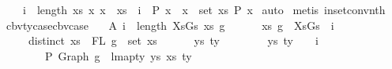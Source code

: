 \begin{isabellebody}
\ \ \ \ {\isachardoublequoteopen}{\isacharparenleft}{\kern0pt}{\isasymforall}i\ {\isacharless}{\kern0pt}\ length\ xs{\isachardot}{\kern0pt}\ {\isasymforall}x{\isachardot}{\kern0pt}\ {\isacharparenleft}{\kern0pt}x\ {\isacharequal}{\kern0pt}\ xs\ {\isacharbang}{\kern0pt}\ i\ {\isacharminus}{\kern0pt}{\isacharminus}{\kern0pt}{\isachargreater}{\kern0pt}\ P\ x{\isacharparenright}{\kern0pt}{\isacharparenright}{\kern0pt}\ {\isacharequal}{\kern0pt}\ {\isacharparenleft}{\kern0pt}{\isasymforall}x\ {\isasymin}\ set\ xs{\isachardot}{\kern0pt}\ {\isacharparenleft}{\kern0pt}P\ x{\isacharparenright}{\kern0pt}{\isacharparenright}{\kern0pt}{\isachardoublequoteclose}\isanewline
%
\isadelimproof
%
\endisadelimproof
%
\isatagproof
{}\isamarkupfalse%
\ auto\isanewline
{}\isamarkupfalse%
\ {\isacharparenleft}{\kern0pt}metis\ in{\isacharunderscore}{\kern0pt}set{\isacharunderscore}{\kern0pt}conv{\isacharunderscore}{\kern0pt}nth{\isacharparenright}{\kern0pt}%
\endisatagproof
{\isafoldproof}%
%
\isadelimproof
\isanewline
%
\endisadelimproof
\isanewline
\isanewline
{}\isamarkupfalse%
\ cbv{\isacharunderscore}{\kern0pt}ty{\isacharunderscore}{\kern0pt}case{\isacharunderscore}{\kern0pt}cbv{\isacharunderscore}{\kern0pt}case{\isacharcolon}{\kern0pt}\isanewline
\ \ \ A{}{\isacharcolon}{\kern0pt}\ {\isachardoublequoteopen}{\isasymforall}i\ {\isacharless}{\kern0pt}\ length\ XsGs{\isachardot}{\kern0pt}\ {\isasymforall}xs\ g{\isachardot}{\kern0pt}\ {\isacharparenleft}{\kern0pt}\isanewline
\ \ \ \ \ {\isacharparenleft}{\kern0pt}xs{\isacharcomma}{\kern0pt}\ g{\isacharparenright}{\kern0pt}\ {\isacharequal}{\kern0pt}\ XsGs\ {\isacharbang}{\kern0pt}\ i\ {\isacharminus}{\kern0pt}{\isacharminus}{\kern0pt}{\isachargreater}{\kern0pt}\isanewline
\ \ \ \ \ distinct\ xs\ {\isasymand}\ FL\ g\ {\isacharequal}{\kern0pt}\ set\ xs\ {\isasymand}\isanewline
\ \ \ \ \ {\isacharparenleft}{\kern0pt}{\isasymforall}ys\ ty{\isachardot}{\kern0pt}\ {\isacharparenleft}{\kern0pt}\isanewline
\ \ \ \ \ \ \ {\isacharparenleft}{\kern0pt}ys{\isacharcomma}{\kern0pt}\ ty{\isacharparenright}{\kern0pt}\ {\isacharequal}{\kern0pt}\ {\isasymGamma}\ {\isacharbang}{\kern0pt}\ i\ {\isacharminus}{\kern0pt}{\isacharminus}{\kern0pt}{\isachargreater}{\kern0pt}\isanewline
\ \ \ \ \ \ \ {\isacharbrackleft}{\kern0pt}{\isacharbrackright}{\kern0pt}\ {\isasymturnstile}{\isacharbraceleft}{\kern0pt}P{\isacharbraceright}{\kern0pt}\ {\isacharparenleft}{\kern0pt}Graph\ g{\isacharparenright}{\kern0pt}\ {\isacharcolon}{\kern0pt}\ lmap{\isacharunderscore}{\kern0pt}ty\ ys\ xs\ ty{\isacharparenright}{\kern0pt}{\isacharparenright}{\kern0pt}{\isacharparenright}{\kern0pt}{\isachardoublequoteclose}\isanewline

\end{isabellebody}
